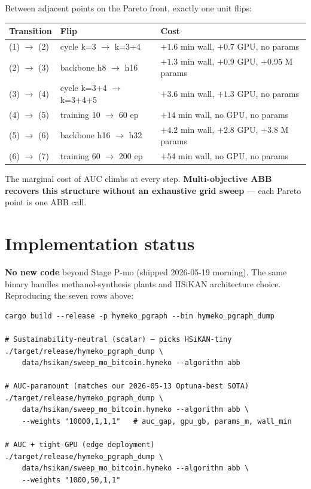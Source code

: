 \documentclass[11pt,a4paper]{article}
\begin{document}
Between adjacent points on the Pareto front, exactly one unit flips:

\begin{center}\footnotesize
\begin{tabular}{lll}
\toprule
Transition & Flip & Cost \\
\midrule
(1) $\to$ (2) & cycle k=3 $\to$ k=3+4    & $+1.6$ min wall, $+0.7$ GPU, no params \\
(2) $\to$ (3) & backbone h8 $\to$ h16    & $+1.3$ min wall, $+0.9$ GPU, $+0.95$ M params \\
(3) $\to$ (4) & cycle k=3+4 $\to$ k=3+4+5 & $+3.6$ min wall, $+1.3$ GPU, no params \\
(4) $\to$ (5) & training 10 $\to$ 60 ep   & $+14$ min wall, no GPU, no params \\
(5) $\to$ (6) & backbone h16 $\to$ h32    & $+4.2$ min wall, $+2.8$ GPU, $+3.8$ M params \\
(6) $\to$ (7) & training 60 $\to$ 200 ep  & $+54$ min wall, no GPU, no params \\
\bottomrule
\end{tabular}
\end{center}

The marginal cost of AUC climbs at every step. \textbf{Multi-objective
ABB recovers this structure without an exhaustive grid sweep} ---
each Pareto point is one ABB call.

\section{Implementation status}

\textbf{No new code} beyond Stage P-mo (shipped 2026-05-19 morning).
The same binary handles methanol-synthesis plants and HSiKAN
architecture choice. Reproducing the seven rows above:

\begin{lstlisting}
cargo build --release -p hymeko_pgraph --bin hymeko_pgraph_dump

# Sustainability-neutral (scalar) — picks HSiKAN-tiny
./target/release/hymeko_pgraph_dump \
    data/hsikan/sweep_mo_bitcoin.hymeko --algorithm abb

# AUC-paramount (matches our 2026-05-13 Optuna-best SOTA)
./target/release/hymeko_pgraph_dump \
    data/hsikan/sweep_mo_bitcoin.hymeko --algorithm abb \
    --weights "10000,1,1,1"   # auc_gap, gpu_gb, params_m, wall_min

# AUC + tight-GPU (edge deployment)
./target/release/hymeko_pgraph_dump \
    data/hsikan/sweep_mo_bitcoin.hymeko --algorithm abb \
    --weights "1000,50,1,1"
\end{lstlisting}
\end{document}
